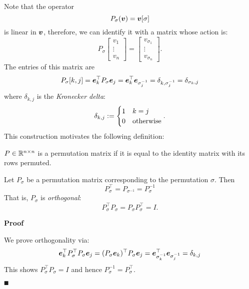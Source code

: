 Note that the operator
\[
P_\sigma(\bm{{\mbox{\boldmath$v$\unboldmath}}}) = \bm{{\mbox{\boldmath$v$\unboldmath}}}[{\mathbf \sigma}]
\]
is linear in $\bm{{\mbox{\boldmath$v$\unboldmath}}}$, therefore, we can identify it with a matrix whose action is:
\[
P_\ensuremath{\sigma} \begin{bmatrix} v_1\\ \vdots \\ v_n \end{bmatrix} = \begin{bmatrix}v_{\ensuremath{\sigma}_1} \\ \vdots \\ v_{\ensuremath{\sigma}_n}  \end{bmatrix}.
\]
The entries of this matrix are
\[
P_\sigma[k,j] = \bm{{\mbox{\boldmath$e$\unboldmath}}}_k^\top P_\sigma \bm{{\mbox{\boldmath$e$\unboldmath}}}_j = \bm{{\mbox{\boldmath$e$\unboldmath}}}_k^\top \bm{{\mbox{\boldmath$e$\unboldmath}}}_{\sigma^{-1}_j} = \delta_{k,\sigma^{-1}_j} = \delta_{\sigma_k,j}
\]
where $\ensuremath{\delta}_{k,j}$ is the \emph{Kronecker delta}:
\[
\ensuremath{\delta}_{k,j} := \begin{cases} 1 & k = j \\
                        0 & \hbox{otherwise}
                        \end{cases}.
\]
This construction motivates the following definition:

\begin{definition} $P \in {\mathbb R}^{n \times n}$ is a permutation matrix if it is equal to the identity matrix with its rows permuted. \end{definition}

\begin{proposition}  Let $P_\ensuremath{\sigma}$ be a permutation matrix corresponding to the permutation $\ensuremath{\sigma}$. Then
\[
P_\ensuremath{\sigma}^\ensuremath{\top} = P_{\ensuremath{\sigma}^{-1}} = P_\ensuremath{\sigma}^{-1}
\]
That is, $P_\ensuremath{\sigma}$ is \emph{orthogonal}:
\[
P_\ensuremath{\sigma}^\ensuremath{\top} P_\ensuremath{\sigma} = P_\ensuremath{\sigma} P_\ensuremath{\sigma}^\ensuremath{\top} = I.
\]
\end{proposition}
\textbf{Proof}

We prove orthogonality via:
\[
\bm{{\mbox{\boldmath$e$\unboldmath}}}_k^\top P_\sigma^\top P_\sigma \bm{{\mbox{\boldmath$e$\unboldmath}}}_j = (P_\sigma \bm{{\mbox{\boldmath$e$\unboldmath}}}_k)^\top P_\sigma \bm{{\mbox{\boldmath$e$\unboldmath}}}_j = \bm{{\mbox{\boldmath$e$\unboldmath}}}_{\sigma^{-1}_k}^\top \bm{{\mbox{\boldmath$e$\unboldmath}}}_{\sigma^{-1}_j} = \delta_{k,j}
\]
This shows $P_\ensuremath{\sigma}^\ensuremath{\top} P_\ensuremath{\sigma} = I$ and hence $P_\ensuremath{\sigma}^{-1} = P_\ensuremath{\sigma}^\ensuremath{\top}$. 

\ensuremath{\QED}



